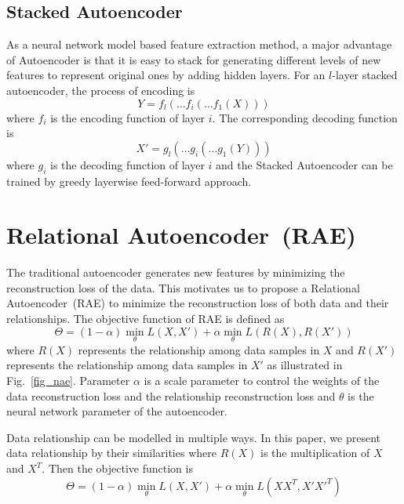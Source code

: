\documentclass[conference]{IEEEtran}
\begin{document}
	\subsection{Stacked Autoencoder}
	As a neural network model based feature extraction method, a major advantage of Autoencoder is that it is easy to stack for generating different levels of new features to represent original ones by adding hidden layers. For an $l$-layer stacked autoencoder, the process of encoding is
	\begin{equation}
	Y = f_{l}(\ldots f_{i}( \ldots f_{1}(X)))
	\end{equation}
	where $f_{i}$ is the encoding function of layer $i$. The corresponding decoding function is
	\begin{equation}
	X' = g_{l}(\ldots g_{i}( \ldots g_{1}(Y)))
	\end{equation}
	where $g_{i}$ is the decoding function of layer $i$ and the Stacked Autoencoder can be trained by greedy layerwise feed-forward approach.
	
	\section{Relational Autoencoder~(RAE)}  \label{sec4}
	The traditional autoencoder generates new features by minimizing the reconstruction loss of the data. This motivates us to propose a Relational Autoencoder~(RAE) to minimize the reconstruction loss of both data and their relationships. The objective function of RAE is defined as
	\begin{equation}
	\Theta = (1-\alpha)\min_{\theta} L(X, X') + \alpha\min_{\theta}L(R(X), R(X'))
	\end{equation}
	where $R(X)$ represents the relationship among data samples in $X$ and $R(X')$ represents the relationship among data samples in $X'$ as illustrated in Fig.~\ref{fig_nae}. Parameter $\alpha$ is a scale parameter to control the weights of the data reconstruction loss and the relationship reconstruction loss and $\theta$ is the neural network parameter of the autoencoder.
	
	Data relationship can be modelled in multiple ways. In this paper, we present data relationship by their similarities where $R(X)$ is the multiplication of $X$ and $X^{T}$. Then the objective function is
	\begin{equation}
	\Theta = (1-\alpha)\min_{\theta} L(X, X') + \alpha\min_{\theta}L(XX^{T}, X'X'^{T})
	\end{equation}
	
\end{document}
